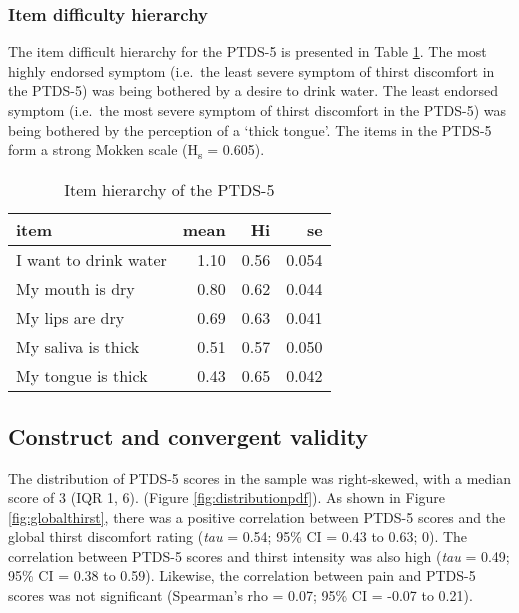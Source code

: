 \documentclass[12pt,twoside,]{pinp}
\begin{document}
\hypertarget{item-difficulty-hierarchy}{%
\subsubsection{Item difficulty
hierarchy}\label{item-difficulty-hierarchy}}

The item difficult hierarchy for the PTDS-5 is presented in Table
\ref{tab:hierarchytabpdf}. The most highly endorsed symptom (i.e.~the
least severe symptom of thirst discomfort in the PTDS-5) was being
bothered by a desire to drink water. The least endorsed symptom
(i.e.~the most severe symptom of thirst discomfort in the PTDS-5) was
being bothered by the perception of a `thick tongue'. The items in the
PTDS-5 form a strong Mokken scale (H\textsubscript{s} = 0.605).

\begin{table}

\caption{\label{tab:hierarchytabpdf}Item hierarchy of the PTDS-5}
\centering
\begin{tabular}[t]{lrrr}
\toprule
item & mean & Hi & se\\
\midrule
I want to drink water & 1.10 & 0.56 & 0.054\\
My mouth is dry & 0.80 & 0.62 & 0.044\\
My lips are dry & 0.69 & 0.63 & 0.041\\
My saliva is thick & 0.51 & 0.57 & 0.050\\
My tongue is thick & 0.43 & 0.65 & 0.042\\
\bottomrule
\end{tabular}
\end{table}

\hypertarget{construct-and-convergent-validity}{%
\subsection{Construct and convergent
validity}\label{construct-and-convergent-validity}}

The distribution of PTDS-5 scores in the sample was right-skewed, with a
median score of 3 (IQR 1, 6). (Figure \ref{fig:distributionpdf}). As
shown in Figure \ref{fig:globalthirst}, there was a positive correlation
between PTDS-5 scores and the global thirst discomfort rating
(\emph{tau} = 0.54; 95\% CI = 0.43 to 0.63; 0). The correlation between
PTDS-5 scores and thirst intensity was also high (\emph{tau} = 0.49;
95\% CI = 0.38 to 0.59). Likewise, the correlation between pain and
PTDS-5 scores was not significant (Spearman's rho = 0.07; 95\% CI =
-0.07 to 0.21).
\end{document}
